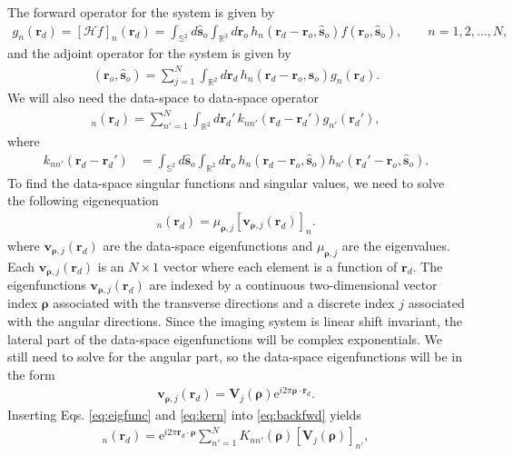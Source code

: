 \documentclass[11pt]{article}
\newcommand{\me}{\mathrm{e}}
\providecommand{\mb}[1]{\mathbf{#1}}
\providecommand{\ro}[1]{\mathbf{\mathbf{r}}_o}
\providecommand{\so}[1]{\mathbf{\hat{s}}_o}
\providecommand{\rd}[1]{\mathbf{r}_d}
\providecommand{\mbb}[1]{\mathbb{#1}}
\providecommand{\bs}[1]{\boldsymbol{#1}}
\begin{document}
The forward operator for the system is given by
\begin{align}
    g_n(\rd{}) = [\mathcal{H}f]_n(\rd{}) = \int_{\mbb{S}^2}d\so{}\int_{\mbb{R}^3}d\ro{}\, h_n(\rd{} - \ro{}, \so{})f(\ro{}, \so{}),\qquad  n=1, 2,\ldots,N, \label{eq:fwd}
\end{align}
and the adjoint operator for the system is given by
\begin{align}
    [\mathcal{H}^{\dagger}\mb{g}](\ro{}, \so{}) = \sum_{j=1}^N\int_{\mbb{R}^2}d\mb{r}_{d}\, h_n(\rd{} - \ro{}, \so{})g_n(\rd{}).\label{eq:adj}
\end{align}
We will also need the data-space to data-space operator
\begin{align}
  [\mathcal{H}\mathcal{H}^{\dagger}\mb{g}]_n(\rd{}) = \sum_{n'=1}^N\int_{\mbb{R}^2}d\rd{}'\, k_{nn'}(\rd{} - \rd{}')g_{n'}(\rd{}'), \label{eq:backfwd}
\end{align}
where 
\begin{align}
  k_{nn'}(\rd{} - \rd{}') &= \int_{\mbb{S}^2}d\so{}\int_{\mbb{R}^2}d\ro{}\, h_n(\rd{} - \ro{}, \so{})h_{n'}(\rd{}' - \ro{}, \so{}). \label{eq:kern}
\end{align}
To find the data-space singular functions and singular values, we need to
solve the following eigenequation
\begin{align}
  [\mathcal{H}\mathcal{H}^{\dagger}\mb{v}_{\bs{\rho}, j}]_n(\rd{}) = \mu_{\bs{\rho}, j} [\mb{v}_{\bs{\rho}, j}(\rd{})]_n. \label{eq:eigval}
\end{align}
where $\mb{v}_{\bs{\rho}, j}(\rd{})$ are the data-space eigenfunctions and
$\mu_{\bs{\rho}, j}$ are the eigenvalues. Each $\mb{v}_{\bs{\rho}, j}(\rd{})$ is
an $N\times 1$ vector where each element is a function of $\rd{}$. The eigenfunctions $\mb{v}_{\bs{\rho}, j}(\rd{})$ are indexed by a
continuous two-dimensional vector index $\bs{\rho}$ associated with the
transverse directions and a discrete index $j$ associated with the angular
directions. Since the imaging system is linear shift invariant, the lateral part
of the data-space eigenfunctions will be complex exponentials. We still need to
solve for the angular part, so the data-space eigenfunctions will be in the form
\begin{align}
  \mb{v}_{\bs{\rho},j}(\rd{}) = \mb{V}_j(\bs{\rho})\me{}^{i 2\pi \bs{\rho}\cdot\rd{}}. \label{eq:eigfunc}
\end{align}
Inserting Eqs. \ref{eq:eigfunc} and \ref{eq:kern} into \ref{eq:backfwd} yields
\begin{align}
  [\mathcal{H}\mathcal{H}^{\dagger}\mb{v}_{\bs{\rho},j}]_n(\rd{}) = \me{}^{i 2\pi \rd{}\cdot\bs{\rho}} \sum_{n'=1}^N K_{nn'}(\bs{\rho})[\mb{V}_j(\bs{\rho})]_{n'}, \label{eq:exp}
\end{align}
\end{document}
